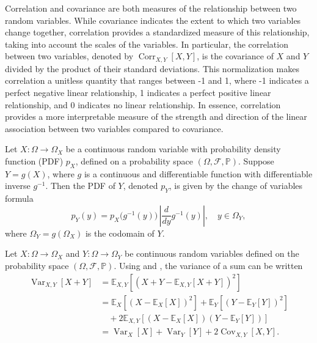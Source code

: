 \begin{remark}
	Correlation and covariance are both measures of the relationship between two random variables. While covariance indicates the extent to which two variables change together, correlation provides a standardized measure of this relationship, taking into account the scales of the variables. In particular, the correlation between two variables, denoted by $\operatorname{Corr}_{X,Y}[X, Y]$, is the covariance of $X$ and $Y$ divided by the product of their standard deviations. This normalization makes correlation a unitless quantity that ranges between -1 and 1, where -1 indicates a perfect negative linear relationship, 1 indicates a perfect positive linear relationship, and 0 indicates no linear relationship. In essence, correlation provides a more interpretable measure of the strength and direction of the linear association between two variables compared to covariance.
\end{remark}

\begin{definition}
	\label{def:change_of_variables}
	Let $X\colon \Omega \to \Omega_X$ be a continuous random variable with probability density function (PDF) $p_X$, defined on a probability space $(\Omega, \mathcal{F}, \mathbb{P})$. Suppose $Y = g(X)$, where $g$ is a continuous and differentiable function with differentiable inverse $g^{-1}$. Then the PDF of $Y$, denoted $p_Y$, is given by the change of variables formula~\cite{Sivia2006}
	\begin{equation}
		p_Y(y) = p_X\bigl(g^{-1}(y)\bigr) \, \left| \frac{d}{dy} g^{-1}(y) \right|, \quad y \in \Omega_Y,
	\end{equation}
	where $\Omega_Y = g(\Omega_X)$ is the codomain of $Y$.
\end{definition}

\begin{example}
	Let $X\colon \Omega \to \Omega_X$ and $Y\colon\Omega \to \Omega_Y$ be continuous random variables defined on the probability space $(\Omega, \mathcal{F}, \mathbb{P})$. Using  and , the variance of a sum can be written
	\begin{equation}
		\begin{split}
			\operatorname{Var}_{X,Y}[X+Y] &= \mathbb{E}_{X,Y}[(X+Y-\mathbb{E}_{X,Y}[X+Y])^2]\\
			&= \mathbb{E}_X[(X-\mathbb{E}_X[X])^2]+\mathbb{E}_Y[(Y-\mathbb{E}_Y[Y])^2]\\
			&\quad+2\mathbb{E}_{X,Y}[(X-\mathbb{E}_X[X])(Y-\mathbb{E}_Y[Y])]\\
			& = \operatorname{Var}_X[X]+\operatorname{Var}_Y[Y]+2\operatorname{Cov}_{X,Y}[X,Y].
		\end{split}
	\end{equation}
\end{example}

